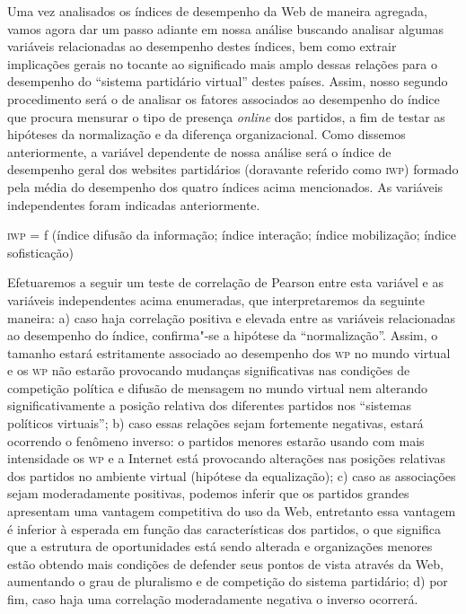 Uma vez analisados os índices de desempenho da Web de maneira agregada,
vamos agora dar um passo adiante em nossa análise buscando analisar
algumas variáveis relacionadas ao desempenho destes índices, bem como
extrair implicações gerais no tocante ao significado mais amplo dessas
relações para o desempenho do ``sistema partidário virtual'' destes
países. Assim, nosso segundo procedimento será o de analisar os fatores
associados ao desempenho do índice que procura mensurar o tipo de
presença \emph{online} dos partidos, a fim de testar as hipóteses da
normalização e da diferença organizacional. Como dissemos anteriormente,
a variável dependente de nossa análise será o índice de desempenho geral
dos websites partidários (doravante referido como \textsc{iwp}) formado pela
média do desempenho dos quatro índices acima mencionados. As variáveis
independentes foram indicadas anteriormente.

\asterisc
\textsc{iwp} = f (índice difusão da informação; índice interação; índice
mobilização; índice sofisticação)
\asterisc

Efetuaremos a seguir um teste de correlação de Pearson entre esta
variável e as variáveis independentes acima enumeradas, que
interpretaremos da seguinte maneira: a) caso haja correlação positiva e
elevada entre as variáveis relacionadas ao desempenho do índice,
confirma"-se a hipótese da ``normalização''. Assim, o tamanho estará
estritamente associado ao desempenho dos \textsc{wp} no mundo virtual e os \textsc{wp} não
estarão provocando mudanças significativas nas condições de competição
política e difusão de mensagem no mundo virtual nem alterando
significativamente a posição relativa dos diferentes partidos nos
``sistemas políticos virtuais''; b) caso essas relações sejam fortemente
negativas, estará ocorrendo o fenômeno inverso: o partidos menores
estarão usando com mais intensidade os \textsc{wp} e a Internet está provocando
alterações nas posições relativas dos partidos no ambiente virtual
(hipótese da equalização); c) caso as associações sejam moderadamente
positivas, podemos inferir que os partidos grandes apresentam uma
vantagem competitiva do uso da Web, entretanto essa vantagem é inferior
à esperada em função das características dos partidos, o que significa
que a estrutura de oportunidades está sendo alterada e organizações
menores estão obtendo mais condições de defender seus pontos de vista
através da Web, aumentando o grau de pluralismo e de competição do
sistema partidário; d) por fim, caso haja uma correlação moderadamente
negativa o inverso ocorrerá.

